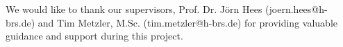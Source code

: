 

    {
We would like to thank our supervisors, Prof. Dr. Jörn Hees (joern.hees@h-brs.de) and Tim Metzler, M.Sc. (tim.metzler@h-brs.de) for providing valuable guidance and support during this project.
    }

